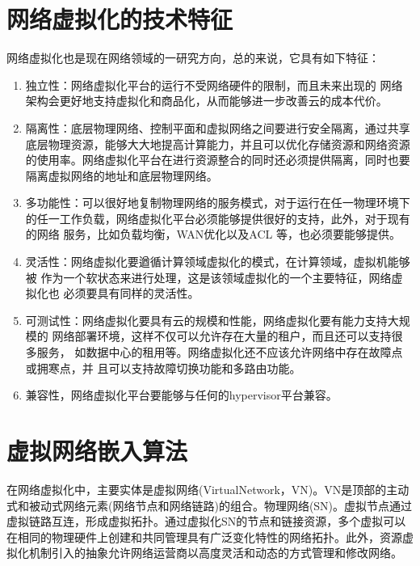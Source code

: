 



\section{网络虚拟化的技术特征}
网络虚拟化也是现在网络领域的一研究方向，总的来说，它具有如下特征：
\begin{enumerate}
  \item 独立性：网络虚拟化平台的运行不受网络硬件的限制，而且未来出现的 网络架构会更好地支持虚拟化和商品化，从而能够进一步改善云的成本代价。
  \item 隔离性：底层物理网络、控制平面和虚拟网络之间要进行安全隔离，通过共享底层物理资源，能够大大地提高计算能力，并且可以优化存储资源和网络资源的使用率。网络虚拟化平台在进行资源整合的同时还必须提供隔离，同时也要隔离虚拟网络的地址和底层物理网络。
  \item 多功能性：可以很好地复制物理网络的服务模式，对于运行在任一物理环境下的任一工作负载，网络虚拟化平台必须能够提供很好的支持，此外，对于现有的网络 服务，比如负载均衡，WAN优化以及ACL 等，也必须要能够提供。
  \item  灵活性：网络虚拟化要遒循计算领域虚拟化的模式，在计算领域，虚拟机能够被 作为一个软状态来进行处理，这是该领域虚拟化的一个主要特征，网络虚拟化也 必须要具有同样的灵活性。
  \item   可测试性：网络虚拟化要具有云的规模和性能，网络虚拟化要有能力支持大规模的 网络部署环境，这样不仅可以允许存在大量的租户，而且还可以支持很多服务， 如数据中心的租用等。网络虚拟化还不应该允许网络中存在故障点或拥寒点，并 且可以支持故障切换功能和多路由功能。
  \item 兼容性，网络虚拟化平台要能够与任何的hypervisor平台兼容。
\end{enumerate}


\section{虚拟网络嵌入算法}
在网络虚拟化中，主要实体是虚拟网络(VirtualNetwork，VN)。VN是顶部的主动式和被动式网络元素(网络节点和网络链路)的组合。物理网络(SN)。虚拟节点通过虚拟链路互连，形成虚拟拓扑。通过虚拟化SN的节点和链接资源，多个虚拟可以在相同的物理硬件上创建和共同管理具有广泛变化特性的网络拓扑。此外，资源虚拟化机制引入的抽象允许网络运营商以高度灵活和动态的方式管理和修改网络。

